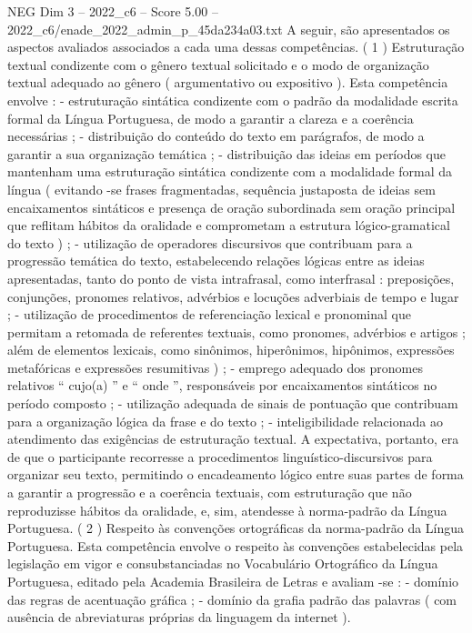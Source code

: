 \begin{textsample}{NEG Dim 3 – 2022\_c6 – Score 5.00 – 2022\_c6/enade\_2022\_admin\_p\_45da234a03.txt}
A seguir, são apresentados os aspectos avaliados associados a cada uma dessas competências. ( 1 ) Estruturação textual condizente com o gênero textual solicitado e o modo de organização textual adequado ao gênero ( argumentativo ou expositivo ).
Esta competência envolve : - estruturação sintática condizente com o padrão da modalidade escrita formal da Língua Portuguesa, de modo a garantir a clareza e a coerência necessárias ; - distribuição do conteúdo do texto em parágrafos, de modo a garantir a sua organização temática ; - distribuição das ideias em períodos que mantenham uma estruturação sintática condizente com a modalidade formal da língua ( evitando -se frases fragmentadas, sequência justaposta de ideias sem encaixamentos sintáticos e presença de oração subordinada sem oração principal que reflitam hábitos da oralidade e comprometam a estrutura lógico-gramatical do texto ) ; - utilização de operadores discursivos que contribuam para a progressão temática do texto, estabelecendo relações lógicas entre as ideias apresentadas, tanto do ponto de vista intrafrasal, como interfrasal : preposições, conjunções, pronomes relativos, advérbios e locuções adverbiais de tempo e lugar ; - utilização de procedimentos de referenciação lexical e pronominal que permitam a retomada de referentes textuais, como pronomes, advérbios e artigos ; além de elementos lexicais, como sinônimos, hiperônimos, hipônimos, expressões metafóricas e expressões resumitivas ) ; - emprego adequado dos pronomes relativos “ cujo(a) ” e “ onde ”, responsáveis por encaixamentos sintáticos no período composto ; - utilização adequada de sinais de pontuação que contribuam para a organização lógica da frase e do texto ; - inteligibilidade relacionada ao atendimento das exigências de estruturação textual.
A expectativa, portanto, era de que o participante recorresse a procedimentos linguístico-discursivos para organizar seu texto, permitindo o encadeamento lógico entre suas partes de forma a garantir a progressão e a coerência textuais, com estruturação que não reproduzisse hábitos da oralidade, e, sim, atendesse à norma-padrão da Língua Portuguesa. ( 2 ) Respeito às convenções ortográficas da norma-padrão da Língua Portuguesa.
Esta competência envolve o respeito às convenções estabelecidas pela legislação em vigor e consubstanciadas no Vocabulário Ortográfico da Língua Portuguesa, editado pela Academia Brasileira de Letras e avaliam -se : - domínio das regras de acentuação gráfica ; - domínio da grafia padrão das palavras ( com ausência de abreviaturas próprias da linguagem da internet ).

\end{textsample}
